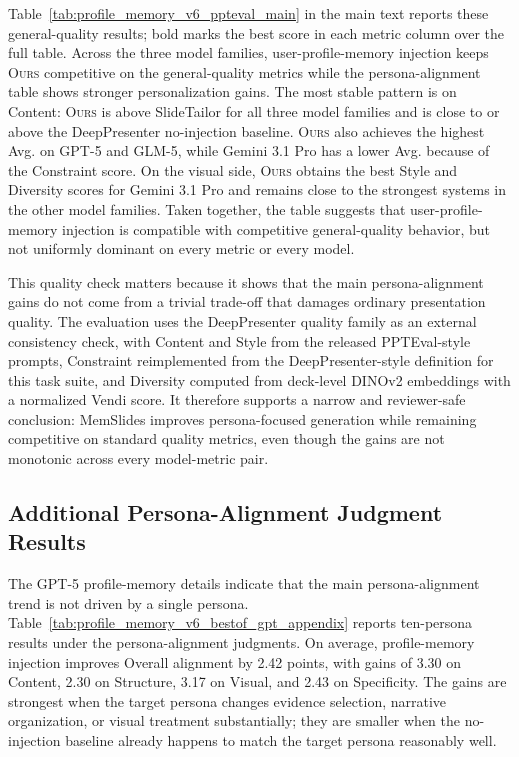 Table~\ref{tab:profile_memory_v6_ppteval_main} in the main text reports these
general-quality results; bold marks the best score in each metric column over
the full table. Across the three model families, user-profile-memory injection
keeps \textsc{Ours} competitive on the general-quality metrics while the
persona-alignment table shows stronger personalization gains.
The most stable pattern is on Content: \textsc{Ours} is above SlideTailor for
all three model families and is close to or above the DeepPresenter no-injection
baseline. \textsc{Ours} also achieves the highest Avg. on GPT-5 and GLM-5, while
Gemini 3.1 Pro has a lower Avg. because of the Constraint score. On the visual
side, \textsc{Ours} obtains the best Style and Diversity scores for Gemini 3.1
Pro and remains close to the strongest systems in the other model families.
Taken together, the table suggests that user-profile-memory injection is
compatible with competitive general-quality behavior, but not uniformly dominant
on every metric or every model.

This quality check matters because it shows that the main persona-alignment
gains do not come from a trivial trade-off that damages ordinary presentation
quality. The evaluation uses the DeepPresenter quality family as an external
consistency check, with Content and Style from the released PPTEval-style
prompts, Constraint reimplemented from the DeepPresenter-style definition for
this task suite, and Diversity computed from deck-level DINOv2 embeddings with a
normalized Vendi score. It therefore supports a narrow and reviewer-safe
conclusion: MemSlides improves persona-focused generation while remaining
competitive on standard quality metrics, even though the gains are not monotonic
across every model-metric pair.

\subsection{Additional Persona-Alignment Judgment Results}

The GPT-5 profile-memory details indicate that the main persona-alignment trend is
not driven by a single persona. Table~\ref{tab:profile_memory_v6_bestof_gpt_appendix}
reports ten-persona results under the persona-alignment judgments. On
average, profile-memory injection improves Overall alignment by 2.42 points,
with gains of 3.30 on Content, 2.30 on Structure, 3.17 on Visual, and 2.43 on
Specificity. The gains are strongest when the target persona changes evidence
selection, narrative organization, or visual treatment substantially; they are
smaller when the no-injection baseline already happens to match the target
persona reasonably well.

